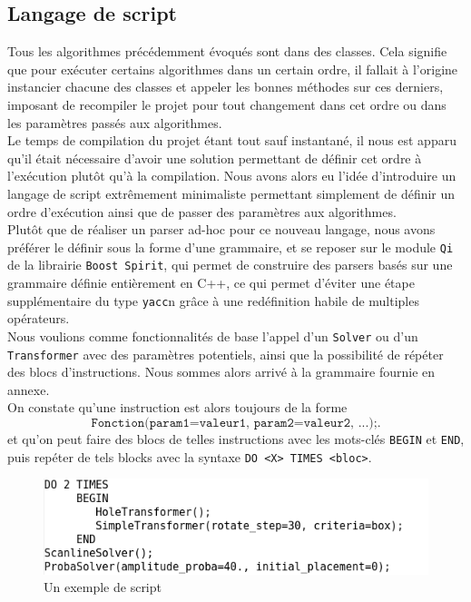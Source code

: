 \subsection{Langage de script}
Tous les algorithmes précédemment évoqués sont dans des classes. Cela signifie que pour exécuter certains algorithmes dans un certain ordre, il fallait à l'origine instancier chacune des classes et appeler les bonnes méthodes sur ces derniers, imposant de recompiler le projet pour tout changement dans cet ordre ou dans les paramètres passés aux algorithmes.\\

Le temps de compilation du projet étant tout sauf instantané, il nous est apparu qu'il était nécessaire d'avoir une solution permettant de définir cet ordre à l'exécution plutôt qu'à la compilation. Nous avons alors eu l'idée d'introduire un langage de script extrêmement minimaliste permettant simplement de définir un ordre d'exécution ainsi que de passer des paramètres aux algorithmes.\\

Plutôt que de réaliser un parser ad-hoc pour ce nouveau langage, nous avons préférer le définir sous la forme d'une grammaire, et se reposer sur le module \texttt{Qi} de la librairie \texttt{Boost Spirit}, qui permet de construire des parsers basés sur une grammaire définie entièrement en C++, ce qui permet d'éviter une étape supplémentaire du type \texttt{yacc}n grâce à une redéfinition habile de multiples opérateurs.\\

Nous voulions comme fonctionnalités de base l'appel d'un \texttt{Solver} ou d'un \texttt{Transformer} avec des paramètres potentiels, ainsi que la possibilité de répéter des blocs d'instructions. Nous sommes alors arrivé à la grammaire fournie en annexe.\\

On constate qu'une instruction est alors toujours de la forme
$$\texttt{Fonction(param1=valeur1, param2=valeur2, ...);}.$$
et qu'on peut faire des blocs de telles instructions avec les mots-clés \texttt{BEGIN} et \texttt{END}, puis repéter de tels blocks avec la syntaxe \texttt{DO <X> TIMES <bloc>}.\\

\begin{figure}[H]
\centering
\includegraphics[scale=0.6]{img/closeEnough.png}
\caption{Un exemple de script}
\label{fig:closeEnough}
\end{figure}

